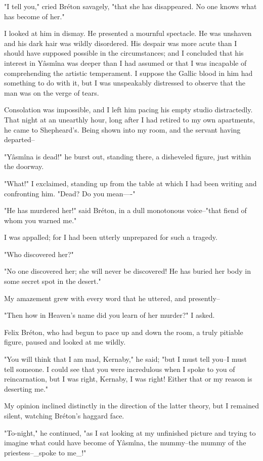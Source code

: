 "I tell you," cried Bréton savagely, "that she has disappeared. No one
knows what has become of her."

I looked at him in dismay. He presented a mournful spectacle. He was
unshaven and his dark hair was wildly disordered. His despair was more
acute than I should have supposed possible in the circumstances; and
I concluded that his interest in Yâsmîna was deeper than I had assumed
or that I was incapable of comprehending the artistic temperament. I
suppose the Gallic blood in him had something to do with it, but I was
unspeakably distressed to observe that the man was on the verge of
tears.

Consolation was impossible, and I left him pacing his empty studio
distractedly. That night at an unearthly hour, long after I had
retired to my own apartments, he came to Shepheard's. Being shown into
my room, and the servant having departed--

"Yâsmîna is dead!" he burst out, standing there, a disheveled figure,
just within the doorway.

"What!" I exclaimed, standing up from the table at which I had been
writing and confronting him. "Dead? Do you mean----"

"He has murdered her!" said Bréton, in a dull monotonous voice--"that
fiend of whom you warned me."

I was appalled; for I had been utterly unprepared for such a tragedy.

"Who discovered her?"

"No one discovered her; she will never be discovered! He has buried
her body in some secret spot in the desert."

My amazement grew with every word that he uttered, and presently--

"Then how in Heaven's name did you learn of her murder?" I asked.

Felix Bréton, who had begun to pace up and down the room, a truly
pitiable figure, paused and looked at me wildly.

"You will think that I am mad, Kernaby," he said; "but I must tell
you--I must tell someone. I could see that you were incredulous when
I spoke to you of reincarnation, but I was right, Kernaby, I was right!
Either that or my reason is deserting me."

My opinion inclined distinctly in the direction of the latter theory,
but I remained silent, watching Bréton's haggard face.

"To-night," he continued, "as I sat looking at my unfinished picture
and trying to imagine what could have become of Yâsmîna, the
mummy--the mummy of the priestess--_spoke to me_!"

